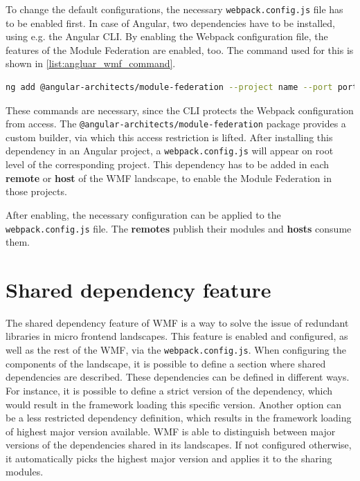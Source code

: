 To change the default configurations, the necessary \texttt{webpack.config.js} file has to be enabled first.
In case of Angular, two dependencies have to be installed, using e.g. the Angular CLI. By enabling the Webpack configuration file, the features of the Module Federation are enabled, too. The command used for this is shown in \ref{list:angluar_wmf_command}. 

\begin{lstlisting}[language=Bash, caption=Angular CLI console command to enable Module Federation in an Angular project, label=list:angluar_wmf_command,  xleftmargin=.0\textwidth, xrightmargin=.0\textwidth]
	ng add @angular-architects/module-federation --project name --port port
\end{lstlisting}

These commands are necessary, since the CLI protects the Webpack configuration from access. The \texttt{@angular-architects/module-federation} package provides a custom builder, via which this access restriction is lifted.
After installing this dependency in an Angular project, a \texttt{webpack.config.js} will appear on root level of the corresponding project.
This dependency has to be added in each \textbf{remote} or \textbf{host} of the WMF landscape, to enable the Module Federation in those projects.\cite{wmf_angular_dependency_install}

After enabling, the necessary configuration can be applied to the \texttt{webpack.config.js} file. The \textbf{remotes} publish their modules and \textbf{hosts} consume them. 

\section{Shared dependency feature}

The shared dependency feature of WMF is a way to solve the issue of redundant libraries in micro frontend landscapes.
This feature is enabled and configured, as well as the rest of the WMF, via the \texttt{webpack.config.js}. When configuring the components of the landscape, it is possible to define a section where shared dependencies are described. These dependencies can be defined in different ways. For instance, it is possible to define a strict version of the dependency, which would result in the framework loading this specific version. Another option can be a less restricted dependency definition, which results in the framework loading of highest major version available. WMF is able to distinguish between major versions of the dependencies shared in its landscapes. If not configured otherwise, it automatically picks the highest major version and applies it to the sharing modules. 

